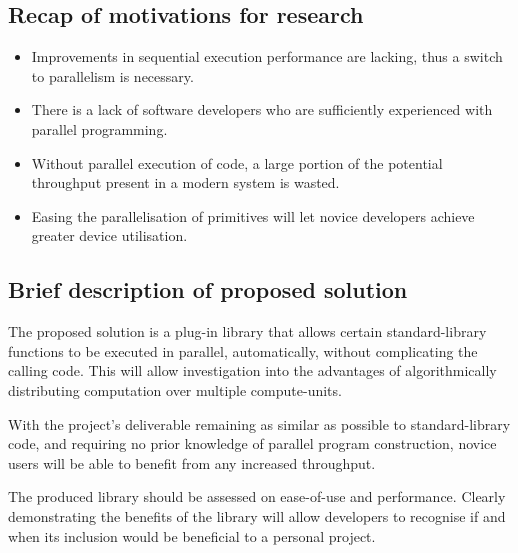 \subsection{Recap of motivations for research}
\begin{itemize}
\item Improvements in sequential execution performance are lacking, thus a switch to parallelism is necessary.

\item There is a lack of software developers who are sufficiently experienced with parallel programming.

\item Without parallel execution of code, a large portion of the potential throughput present in a modern system is wasted.

\item Easing the parallelisation of primitives will let novice developers achieve greater device utilisation.
\end{itemize}

\subsection{Brief description of proposed solution}
The proposed solution is a plug-in library that allows certain standard-library functions to be executed in parallel, automatically, without complicating the calling code.
This will allow investigation into the advantages of algorithmically distributing computation over multiple compute-units.

With the project's deliverable remaining as similar as possible to standard-library code, and requiring no prior knowledge of parallel program construction, novice users will be able to benefit from any increased throughput.

The produced library should be assessed on ease-of-use and performance. Clearly demonstrating the benefits of the library will allow developers to recognise if and when its inclusion would be beneficial to a personal project.
